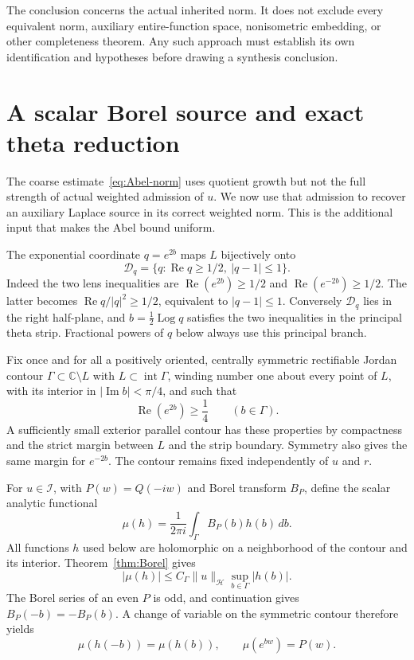 \documentclass[11pt,a4paper]{article}
\numberwithin{equation}{section}
\theoremstyle{definition}
\theoremstyle{remark}
\newcommand{\Hh}{\mathcal H}
\newcommand{\Ii}{\mathcal I}
\newcommand{\norm}[1]{\lVert #1\rVert}
\begin{document}
The conclusion concerns the actual inherited norm. It does not exclude every equivalent norm, auxiliary entire-function space, nonisometric embedding, or other completeness theorem. Any such approach must establish its own identification and hypotheses before drawing a synthesis conclusion.

\section{A scalar Borel source and exact theta reduction}\label{sec:scalar-source}

The coarse estimate~\eqref{eq:Abel-norm} uses quotient growth but not the full strength of actual weighted admission of $u$. We now use that admission to recover an auxiliary Laplace source in its correct weighted norm. This is the additional input that makes the Abel bound uniform.

The exponential coordinate $q=e^{2b}$ maps $L$ bijectively onto
\begin{equation}\label{eq:q-domain}
 \mathcal D_q=\{q:\operatorname{Re}q\ge1/2,\ |q-1|\le1\}.
\end{equation}
Indeed the two lens inequalities are
$\operatorname{Re}(e^{2b})\ge1/2$ and
$\operatorname{Re}(e^{-2b})\ge1/2$. The latter becomes
$\operatorname{Re}q/|q|^2\ge1/2$, equivalent to $|q-1|\le1$.
Conversely $\mathcal D_q$ lies in the right half-plane, and
$b=\frac12\operatorname{Log}q$ satisfies the two inequalities in the principal theta strip. Fractional powers of $q$ below always use this principal branch.

Fix once and for all a positively oriented, centrally symmetric rectifiable Jordan contour $\Gamma\subset\mathbb C\setminus L$ with $L\subset\operatorname{int}\Gamma$, winding number one about every point of $L$, with its interior in $|\operatorname{Im}b|<\pi/4$, and such that
\begin{equation}\label{eq:fixed-contour-margin}
 \operatorname{Re}(e^{2b})\ge\frac14\qquad(b\in\Gamma).
\end{equation}
A sufficiently small exterior parallel contour has these properties by compactness and the strict margin between $L$ and the strip boundary. Symmetry also gives the same margin for $e^{-2b}$. The contour remains fixed independently of $u$ and $r$.

For $u\in\Ii$, with $P(w)=Q(-iw)$ and Borel transform $B_P$, define the scalar analytic functional
\begin{equation}\label{eq:mu-functional}
 \mu(h)=\frac1{2\pi i}\int_\Gamma B_P(b)h(b)\,db.
\end{equation}
All functions $h$ used below are holomorphic on a neighborhood of the contour and its interior. Theorem~\ref{thm:Borel} gives
\begin{equation}\label{eq:mu-bound}
 |\mu(h)|\le C_\Gamma\norm{u}_{\Hh}\sup_{b\in\Gamma}|h(b)|.
\end{equation}
The Borel series of an even $P$ is odd, and continuation gives
$B_P(-b)=-B_P(b)$. A change of variable on the symmetric contour therefore yields
\begin{equation}\label{eq:mu-symmetry}
 \mu(h(-b))=\mu(h(b)),\qquad \mu(e^{bw})=P(w).
\end{equation}
\end{document}
